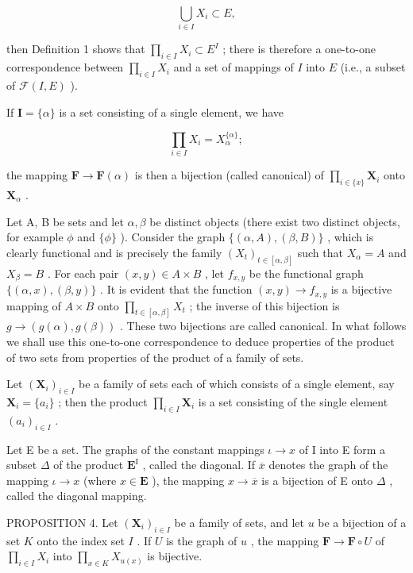 \[
\bigcup_ {i \in I} X _ {i} \subset E,
\]

then Definition 1 shows that \(\prod_{i\in I}X_i\subset E^I\) ; there is therefore a one-to-one correspondence between \(\prod_{i\in I}X_i\) and a set of mappings of \(I\) into \(E\) (i.e., a subset of \(\mathcal{F}(I,E)\) ).

If \(\mathbf{I} = \{\alpha\}\) is a set consisting of a single element, we have

\[
\prod_ {i \in I} X _ {i} = X _ {\alpha} ^ {\{\alpha \}};
\]

the mapping \(\mathbf{F} \to \mathbf{F}(\alpha)\) is then a bijection (called canonical) of \(\prod_{i \in \{x\}} \mathbf{X}_i\) onto \(\mathbf{X}_\alpha\) .

Let A, B be sets and let \(\alpha, \beta\) be distinct objects (there exist two distinct objects, for example \(\phi\) and \(\{\phi\}\) ). Consider the graph \(\{(\alpha, A), (\beta, B)\}\) , which is clearly functional and is precisely the family \((X_{t})_{t \in [\alpha, \beta]}\) such that \(X_{\alpha} = A\) and \(X_{\beta} = B\) . For each pair \((x, y) \in A \times B\) , let \(f_{x,y}\) be the functional graph \(\{(\alpha, x), (\beta, y)\}\) . It is evident that the function \((x, y) \to f_{x,y}\) is a bijective mapping of \(A \times B\) onto \(\prod_{t \in [\alpha, \beta]} X_t\) ; the inverse of this bijection is \(g \to (g(\alpha), g(\beta))\) . These two bijections are called canonical. In what follows we shall use this one-to-one correspondence to deduce properties of the product of two sets from properties of the product of a family of sets.

Let \((\mathbf{X}_i)_{i\in I}\) be a family of sets each of which consists of a single element, say \(\mathbf{X}_i = \{a_i\}\) ; then the product \(\prod_{i\in I}\mathbf{X}_i\) is a set consisting of the single element \((a_i)_{i\in I}\) .

Let E be a set. The graphs of the constant mappings \(\iota \to x\) of I into E form a subset \(\Delta\) of the product \(\mathbf{E}^{\mathrm{I}}\) , called the diagonal. If \(\overline{x}\) denotes the graph of the mapping \(\iota \to x\) (where \(x \in \mathbf{E}\) ), the mapping \(x \to \overline{x}\) is a bijection of E onto \(\Delta\) , called the diagonal mapping.

PROPOSITION 4. Let \((\mathbf{X}_i)_{i\in I}\) be a family of sets, and let \(u\) be a bijection of a set \(K\) onto the index set \(I\) . If \(U\) is the graph of \(u\) , the mapping \(\mathbf{F} \to \mathbf{F} \circ U\) of \(\prod_{i\in I} X_i\) into \(\prod_{x\in K} X_{u(x)}\) is bijective.

